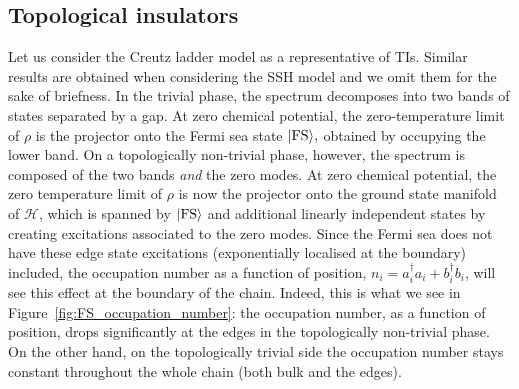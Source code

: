 \subsection{Topological insulators}
\label{sec:edgeTI}
 Let us consider the Creutz ladder model as a representative of TIs. Similar results are obtained when considering the SSH model and we omit them for the sake of briefness. In the trivial phase, the spectrum decomposes into two bands of states separated by a gap. At zero chemical potential, the zero-temperature limit of $\rho$ is the projector onto the Fermi sea state $| \text{FS} \rangle,$ obtained by occupying the lower band. On a topologically non-trivial phase, however, the spectrum is composed of the two bands {\em and} the zero modes. At zero chemical potential, the zero temperature limit of $\rho$ is now the projector onto the ground state manifold of $\mathcal{H}$, which is spanned by $| \text{FS} \rangle$ and additional linearly independent states by creating excitations associated to the zero modes. Since the Fermi sea does not have these edge state excitations (exponentially localised at the boundary) included, the occupation number as a function of position, $n_i=a_i^\dagger a_i+b_i^{\dagger}b_i$, will see this effect at the boundary of the chain. Indeed, this is what we see in Figure~\ref{fig:FS_occupation_number}: the occupation number, as a function of position, drops significantly at the edges in the topologically non-trivial phase. On the other hand, on the topologically trivial side the occupation number stays constant throughout the whole chain (both bulk and the edges).



